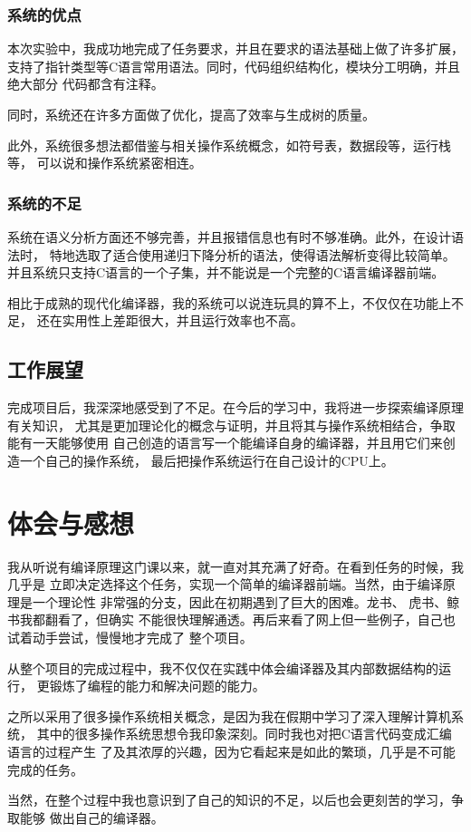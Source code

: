 \subsection{系统的优点}
本次实验中，我成功地完成了任务要求，并且在要求的语法基础上做了许多扩展，
支持了指针类型等C语言常用语法。同时，代码组织结构化，模块分工明确，并且绝大部分
代码都含有注释。

同时，系统还在许多方面做了优化，提高了效率与生成树的质量。

此外，系统很多想法都借鉴与相关操作系统概念，如符号表，数据段等，运行栈等，
可以说和操作系统紧密相连。

\subsection{系统的不足}

系统在语义分析方面还不够完善，并且报错信息也有时不够准确。此外，在设计语法时，
特地选取了适合使用递归下降分析的语法，使得语法解析变得比较简单。
并且系统只支持C语言的一个子集，并不能说是一个完整的C语言编译器前端。

相比于成熟的现代化编译器，我的系统可以说连玩具的算不上，不仅仅在功能上不足，
还在实用性上差距很大，并且运行效率也不高。

\section{工作展望}

完成项目后，我深深地感受到了不足。在今后的学习中，我将进一步探索编译原理有关知识，
尤其是更加理论化的概念与证明，并且将其与操作系统相结合，争取能有一天能够使用
自己创造的语言写一个能编译自身的编译器，并且用它们来创造一个自己的操作系统，
最后把操作系统运行在自己设计的CPU上。

\chapter{体会与感想}

我从听说有编译原理这门课以来，就一直对其充满了好奇。在看到任务的时候，我几乎是
立即决定选择这个任务，实现一个简单的编译器前端。当然，由于编译原理是一个理论性
非常强的分支，因此在初期遇到了巨大的困难。龙书\cite{aho1986compilers}、
虎书\cite{appel2004modern}、鲸书\cite{muchnick1997advanced}我都翻看了，但确实
不能很快理解通透。再后来看了网上但一些例子，自己也试着动手尝试，慢慢地才完成了
整个项目。

从整个项目的完成过程中，我不仅仅在实践中体会编译器及其内部数据结构的运行，
更锻炼了编程的能力和解决问题的能力。

之所以采用了很多操作系统相关概念，是因为我在假期中学习了深入理解计算机系统\cite{bryant2003computer}，
其中的很多操作系统思想令我印象深刻。同时我也对把C语言代码变成汇编语言的过程产生
了及其浓厚的兴趣，因为它看起来是如此的繁琐，几乎是不可能完成的任务。

当然，在整个过程中我也意识到了自己的知识的不足，以后也会更刻苦的学习，争取能够
做出自己的编译器。
